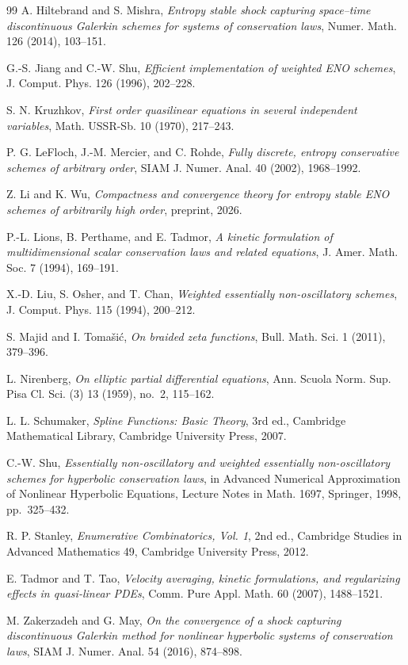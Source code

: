 \documentclass[11pt]{amsart}
\theoremstyle{plain}
\theoremstyle{definition}
\theoremstyle{remark}
\numberwithin{equation}{section}
\theoremstyle{plain}
\begin{document}
\begin{thebibliography}{99}
A. Hiltebrand and S. Mishra,
\emph{Entropy stable shock capturing space--time discontinuous Galerkin
schemes for systems of conservation laws},
Numer. Math. 126 (2014), 103--151.

G.-S. Jiang and C.-W. Shu,
\emph{Efficient implementation of weighted ENO schemes},
J. Comput. Phys. 126 (1996), 202--228.

S. N. Kruzhkov,
\emph{First order quasilinear equations in several independent variables},
Math. USSR-Sb. 10 (1970), 217--243.


P. G. LeFloch, J.-M. Mercier, and C. Rohde,
\emph{Fully discrete, entropy conservative schemes of arbitrary order},
SIAM J. Numer. Anal. 40 (2002), 1968--1992.

Z. Li and K. Wu,
\emph{Compactness and convergence theory for entropy stable ENO schemes 
of arbitrarily high order},
preprint, 2026.

P.-L. Lions, B. Perthame, and E. Tadmor,
\emph{A kinetic formulation of multidimensional scalar conservation laws and
related equations},
J. Amer. Math. Soc. 7 (1994), 169--191.

X.-D. Liu, S. Osher, and T. Chan,
\emph{Weighted essentially non-oscillatory schemes},
J. Comput. Phys. 115 (1994), 200--212.

S. Majid and I. Toma\v{s}i\'c,
\emph{On braided zeta functions}, 
Bull. Math. Sci. 1 (2011), 379--396.

L. Nirenberg,
\emph{On elliptic partial differential equations},
Ann. Scuola Norm. Sup. Pisa Cl. Sci. (3) 13 (1959), no.~2, 115--162.


L. L. Schumaker,
\emph{Spline Functions: Basic Theory}, 3rd ed.,
Cambridge Mathematical Library, Cambridge University Press, 2007.

C.-W. Shu,
\emph{Essentially non-oscillatory and weighted essentially non-oscillatory
schemes for hyperbolic conservation laws},
in Advanced Numerical Approximation of Nonlinear Hyperbolic Equations,
Lecture Notes in Math. 1697, Springer, 1998, pp.~325--432.


R. P. Stanley,
\emph{Enumerative Combinatorics, Vol. 1}, 2nd ed.,
Cambridge Studies in Advanced Mathematics 49, Cambridge University Press,
2012.

E. Tadmor and T. Tao,
\emph{Velocity averaging, kinetic formulations, and regularizing effects in
quasi-linear PDEs},
Comm. Pure Appl. Math. 60 (2007), 1488--1521.

M. Zakerzadeh and G. May,
\emph{On the convergence of a shock capturing discontinuous Galerkin method
for nonlinear hyperbolic systems of conservation laws},
SIAM J. Numer. Anal. 54 (2016), 874--898.

\end{thebibliography}
\end{document}

